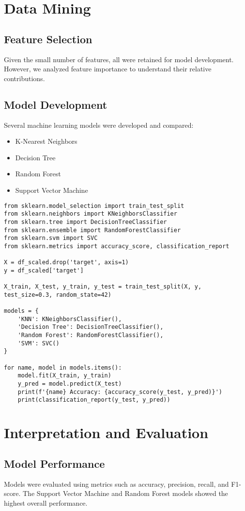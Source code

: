 \documentclass[12pt,a4paper]{article}
\begin{document}
\section{Data Mining}
\subsection{Feature Selection}
Given the small number of features, all were retained for model development. However, we analyzed feature importance to understand their relative contributions.

\subsection{Model Development}
Several machine learning models were developed and compared:
\begin{itemize}
    \item K-Nearest Neighbors
    \item Decision Tree
    \item Random Forest
    \item Support Vector Machine
\end{itemize}

\begin{verbatim}
from sklearn.model_selection import train_test_split
from sklearn.neighbors import KNeighborsClassifier
from sklearn.tree import DecisionTreeClassifier
from sklearn.ensemble import RandomForestClassifier
from sklearn.svm import SVC
from sklearn.metrics import accuracy_score, classification_report

X = df_scaled.drop('target', axis=1)
y = df_scaled['target']

X_train, X_test, y_train, y_test = train_test_split(X, y, test_size=0.3, random_state=42)

models = {
    'KNN': KNeighborsClassifier(),
    'Decision Tree': DecisionTreeClassifier(),
    'Random Forest': RandomForestClassifier(),
    'SVM': SVC()
}

for name, model in models.items():
    model.fit(X_train, y_train)
    y_pred = model.predict(X_test)
    print(f'{name} Accuracy: {accuracy_score(y_test, y_pred)}')
    print(classification_report(y_test, y_pred))
\end{verbatim}

\section{Interpretation and Evaluation}
\subsection{Model Performance}
Models were evaluated using metrics such as accuracy, precision, recall, and F1-score. The Support Vector Machine and Random Forest models showed the highest overall performance.
\end{document}
